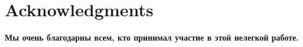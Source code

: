 \section{Acknowledgments}
\textbf{Мы очень благодарны всем, кто принимал участие в этой нелегкой работе.}


